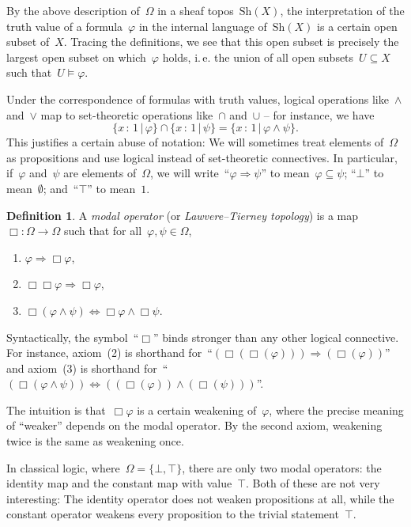 \documentclass[10pt,reqno,a4paper]{amsbook}
\makeatletter
\theoremstyle{definition}
\newtheorem{defn}{Definition}[section]
\theoremstyle{plain}
\theoremstyle{remark}
\newcommand{\Sh}{\mathrm{Sh}}
\newcommand{\?}{\,{:}\,}
\renewcommand{\_}{\mathpunct{.}\,}
\newcommand{\ie}{i.\,e.\@\xspace}
\makeatother
\begin{document}
By the above description of~$\Omega$ in
a sheaf topos~$\Sh(X)$, the interpretation of the truth value
of a formula~$\varphi$ in the internal language of~$\Sh(X)$ is a certain open
subset of~$X$. Tracing the definitions, we see that this open subset is
precisely the largest open subset on which~$\varphi$ holds, \ie the union of
all open subsets~$U \subseteq X$ such that~$U \models \varphi$.

Under the correspondence of formulas with truth values, logical operations
like~$\wedge$ and~$\vee$ map to set-theoretic operations like~$\cap$ and~$\cup$
-- for instance, we have
\[ \{ x \? 1 \,|\, \varphi \} \cap \{ x \? 1 \,|\, \psi \} =
  \{ x \? 1 \,|\, \varphi \wedge \psi \}. \]
This justifies a certain abuse of notation: We will sometimes treat elements
of~$\Omega$ as propositions and use logical instead of set-theoretic
connectives. In particular, if~$\varphi$ and~$\psi$ are elements of~$\Omega$,
we will write~``$\varphi \Rightarrow \psi$'' to mean~$\varphi \subseteq \psi$;
``$\bot$'' to mean~$\emptyset$; and~``$\top$'' to mean~$1$.

\begin{defn}\label{defn:modal-operator}
A \emph{modal operator} (or \emph{Lawvere--Tierney topology}) is a map~$\Box : \Omega \to \Omega$ such
that for all~$\varphi, \psi \in \Omega$,
\begin{enumerate}
\item $\varphi \Longrightarrow \Box\varphi$,
\item $\Box\Box\varphi \Longrightarrow \Box\varphi$,
\item $\Box(\varphi \wedge \psi) \Longleftrightarrow \Box\varphi \wedge \Box\psi$.
\end{enumerate}
Syntactically, the symbol~``$\Box$'' binds stronger than any other logical
connective. For instance, axiom~(2) is shorthand for~``$(\Box(\Box(\varphi)))
\Rightarrow (\Box(\varphi))$'' and axiom~(3) is shorthand for~``$(\Box(\varphi
\wedge \psi)) \Leftrightarrow ((\Box(\varphi)) \wedge (\Box(\psi)))$''.
\end{defn}

The intuition is that~$\Box\varphi$ is a certain weakening of~$\varphi$, where
the precise meaning of ``weaker'' depends on the modal operator. By the second
axiom, weakening twice is the same as weakening once.

In classical logic, where~$\Omega = \{ \bot, \top \}$, there are only two modal
operators: the identity map and the constant map with value~$\top$.
Both of these are not very interesting: The identity operator does not weaken
propositions at all, while the constant operator weakens every proposition to
the trivial statement~$\top$.
\end{document}
